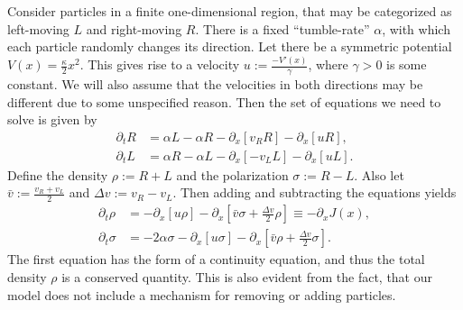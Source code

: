 \documentclass[english, parskip=full]{scrartcl}
\title{\titel}
\author{\autor}
\date{\today}
\newcommand{\klam}{}
\newcommand{\e}{\text{e}}
\begin{document}
\maketitle  %

Consider particles in a finite one-dimensional region, that may be categorized as left-moving $L$ and right-moving $R$.
There is a fixed ``tumble-rate'' $\alpha$, with which each particle randomly changes its direction.
Let there be a symmetric potential $V(x) = \frac{\kappa}{2}x^2$.
This gives rise to a velocity $u := \frac{-V'(x)}{\gamma}$, where $\gamma>0$ is some constant.
We will also assume that the velocities in both directions may be different due to some unspecified reason.
Then the set of equations we need to solve is given by
\begin{align}
\partial_tR &= \alpha L - \alpha R - \partial_x\klam\left[ v_RR \right] - \partial_x\klam\left[ uR \right],\\
\partial_tL &= \alpha R - \alpha L - \partial_x\klam\left[ -v_LL \right] - \partial_x\klam\left[ uL \right].
\end{align}
Define the density $\rho := R+L$ and the polarization $\sigma := R-L$.
Also let $\bar{v} := \frac{v_R + v_L}{2}$ and $\Delta v := v_R - v_L$.
Then adding and subtracting the equations yields
\begin{align}
\partial_t\rho &= -\partial_x \klam\left[ u\rho \right] - \partial_x \klam\left[ \bar{v}\sigma + \frac{\Delta v}{2} \rho \right] \equiv -\partial_xJ(x),\\
\partial_t\sigma &= -2\alpha\sigma -\partial_x\klam\left[ u\sigma \right] - \partial_x\klam\left[ \bar{v}\rho + \frac{\Delta v}{2}\sigma \right].
\end{align}
The first equation has the form of a continuity equation, and thus the total density $\rho$ is a conserved quantity. 
This is also evident from the fact, that our model does not include a mechanism for removing or adding particles.
\end{document}

